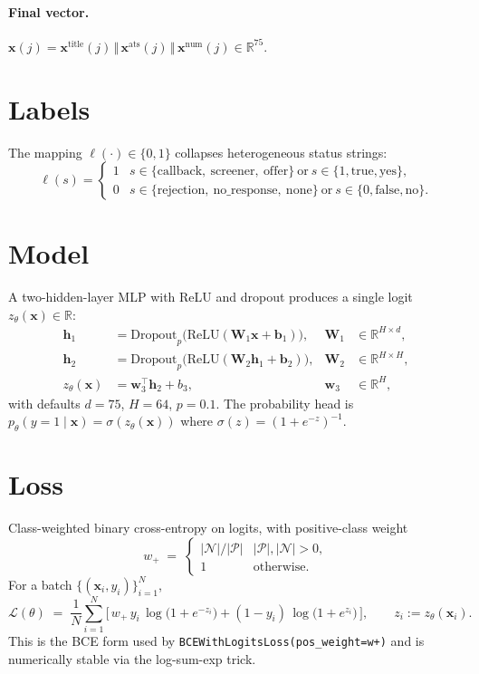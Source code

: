 \documentclass[11pt]{article}
\newcommand{\R}{\mathbb{R}}
\newcommand{\Pos}{\mathcal{P}}
\newcommand{\Neg}{\mathcal{N}}
\begin{document}
\paragraph{Final vector.}
$\bm{x}(j) = \bm{x}^{\text{title}}(j) \,\Vert\, \bm{x}^{\text{ats}}(j) \,\Vert\, \bm{x}^{\text{num}}(j) \in \R^{75}.$

\section{Labels}
The mapping $\ell(\cdot) \in \{0,1\}$ collapses heterogeneous status strings:
\[
  \ell(s) =
    \begin{cases}
      1 & s \in \{\text{callback},\ \text{screener},\ \text{offer}\}\ \text{or}\ s \in \{1, \text{true}, \text{yes}\},\\
      0 & s \in \{\text{rejection},\ \text{no\_response},\ \text{none}\}\ \text{or}\ s \in \{0, \text{false}, \text{no}\}.
    \end{cases}
\]

\section{Model}
A two-hidden-layer MLP with ReLU and dropout produces a single logit
$z_\theta(\bm{x}) \in \R$:
\begin{align*}
  \bm{h}_1 &= \mathrm{Dropout}_p\!\big(\mathrm{ReLU}(\bm{W}_1 \bm{x} + \bm{b}_1)\big), & \bm{W}_1 &\in \R^{H \times d},\\
  \bm{h}_2 &= \mathrm{Dropout}_p\!\big(\mathrm{ReLU}(\bm{W}_2 \bm{h}_1 + \bm{b}_2)\big), & \bm{W}_2 &\in \R^{H \times H},\\
  z_\theta(\bm{x}) &= \bm{w}_3^{\!\top} \bm{h}_2 + b_3, & \bm{w}_3 &\in \R^{H},
\end{align*}
with defaults $d{=}75$, $H{=}64$, $p{=}0.1$. The probability head is
$p_\theta(y{=}1\mid\bm{x}) = \sigma(z_\theta(\bm{x}))$ where
$\sigma(z) = (1+e^{-z})^{-1}$.

\section{Loss}
Class-weighted binary cross-entropy on logits, with positive-class weight
\[
  w_{+} \;=\;
    \begin{cases}
      |\Neg|/|\Pos| & |\Pos|, |\Neg| > 0,\\
      1 & \text{otherwise}.
    \end{cases}
\]
For a batch $\{(\bm{x}_i, y_i)\}_{i=1}^{N}$,
\[
  \mathcal{L}(\theta)
    \;=\; \frac{1}{N} \sum_{i=1}^{N}
        \Big[\, w_{+}\, y_i\, \log\!\big(1 + e^{-z_i}\big)
              + (1 - y_i)\, \log\!\big(1 + e^{z_i}\big) \,\Big],
  \qquad z_i := z_\theta(\bm{x}_i).
\]
This is the BCE form used by \verb|BCEWithLogitsLoss(pos_weight=w+)| and is
numerically stable via the log-sum-exp trick.
\end{document}

